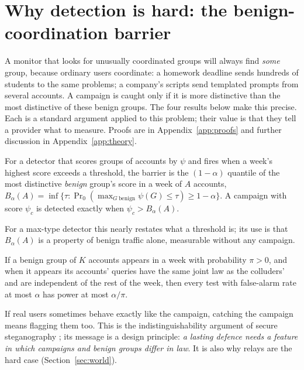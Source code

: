 \section{Why detection is hard: the benign-coordination barrier}
\label{sec:theory}

A monitor that looks for unusually coordinated groups will always find \emph{some} group, because ordinary users coordinate: a homework deadline sends hundreds of students to the same problems; a company's scripts send templated prompts from several accounts. A campaign is caught only if it is more distinctive than the most distinctive of these benign groups. The four results below make this precise. Each is a standard argument applied to this problem; their value is that they tell a provider what to measure. Proofs are in Appendix~\ref{app:proofs} and further discussion in Appendix~\ref{app:theory}.

\begin{definition}\label{def:barrier}
For a detector that scores groups of accounts by $\psi$ and fires when a week's highest score exceeds a threshold, the barrier is the $(1-\alpha)$ quantile of the most distinctive \emph{benign} group's score in a week of $A$ accounts, $B_\alpha(A)=\inf\{\tau:\Pr_0(\max_{G\ \text{benign}}\psi(G)\le\tau)\ge1-\alpha\}$. A campaign with score $\psi_c$ is detected exactly when $\psi_c>B_\alpha(A)$.
\end{definition}

For a max-type detector this nearly restates what a threshold is; its use is that $B_\alpha(A)$ is a property of benign traffic alone, measurable without any campaign.

\begin{proposition}\label{prop:law}
If a benign group of $K$ accounts appears in a week with probability $\pi>0$, and when it appears its accounts' queries have the same joint law as the colluders' and are independent of the rest of the week, then every test with false-alarm rate at most $\alpha$ has power at most $\alpha/\pi$.
\end{proposition}

If real users sometimes behave exactly like the campaign, catching the campaign means flagging them too. This is the indistinguishability argument of secure steganography \citep{hopper2002provably}; its message is a design principle: \emph{a lasting defence needs a feature in which campaigns and benign groups differ in law}. It is also why relays are the hard case (Section~\ref{sec:world}).

